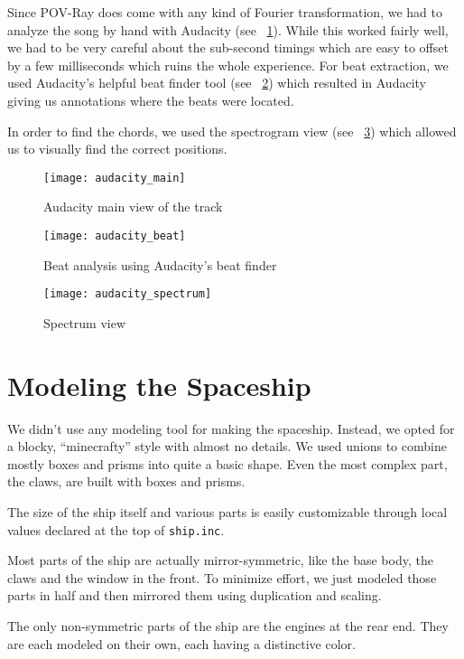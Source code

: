 \documentclass[a4paper, 12pt]{scrartcl}
\begin{document}
    Since POV-Ray does come with any kind of Fourier transformation, we had to analyze the song by
    hand with Audacity (see ~\ref{fig:main}). While this worked fairly well, we had to be very
    careful about the sub-second timings which are easy to offset by a few milliseconds which ruins
    the whole experience. For beat extraction, we used Audacity's helpful beat finder tool (see
    ~\ref{fig:beat}) which resulted in Audacity giving us annotations where the beats were located.

    In order to find the chords, we used the spectrogram view (see ~\ref{fig:spectrogram}) which
    allowed us to visually find the correct positions.

    \begin{figure}[H]
        \centering
        \texttt{[image: audacity\_main]}
        \caption{Audacity main view of the track}
        \label{fig:main}
    \end{figure}

    \begin{figure}[H]
        \centering
        \texttt{[image: audacity\_beat]}
        \caption{Beat analysis using Audacity's beat finder}
        \label{fig:beat}
    \end{figure}

    \begin{figure}[H]
        \centering
        \texttt{[image: audacity\_spectrum]}
        \caption{Spectrum view}
        \label{fig:spectrogram}
    \end{figure}

    \section{Modeling the Spaceship}
    We didn't use any modeling tool for making the spaceship. Instead, we opted for a blocky, ``minecrafty'' style with almost no details. We used unions to combine mostly boxes and prisms into quite a basic shape. Even the most complex part, the claws, are built with boxes and prisms.

    The size of the ship itself and various parts is easily customizable through local values declared at the top of \texttt{ship.inc}.

    Most parts of the ship are actually mirror-symmetric, like the base body, the claws and the window in the front. To minimize effort, we just modeled those parts in half and then mirrored them using duplication and scaling.

    The only non-symmetric parts of the ship are the engines at the rear end. They are each modeled on their own, each having a distinctive color.
\end{document}

